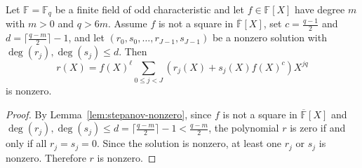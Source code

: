 \begin{lemma}\label{lem:stepanov-constructed-nonzero} \leanok {}
  Let $\mathbb{F} = \mathbb{F}_q$ be a finite field of odd characteristic and let $f \in \mathbb{F}[X]$ have degree $m$ with $m > 0$ and $q > 6m$. Assume $f$ is not a square in $\overline{\mathbb{F}}[X]$, set $c = \frac{q-1}{2}$ and $d = \lceil\frac{q-m}{2}\rceil - 1$, and let $(r_0, s_0, \ldots, r_{J-1}, s_{J-1})$ be a nonzero solution with $\deg(r_j), \deg(s_j) \leq d$. Then
  \[
    r(X) = f(X)^\ell \sum_{0 \leq j < J} (r_j(X) + s_j(X) f(X)^c) X^{jq}
  \]
  is nonzero.
\end{lemma}
\begin{proof} \leanok
  By Lemma~\ref{lem:stepanov-nonzero}, since $f$ is not a square in $\overline{\mathbb{F}}[X]$ and $\deg(r_j), \deg(s_j) \leq d = \lceil\frac{q-m}{2}\rceil - 1 < \frac{q-m}{2}$, the polynomial $r$ is zero if and only if all $r_j = s_j = 0$. Since the solution is nonzero, at least one $r_j$ or $s_j$ is nonzero. Therefore $r$ is nonzero.
\end{proof}

